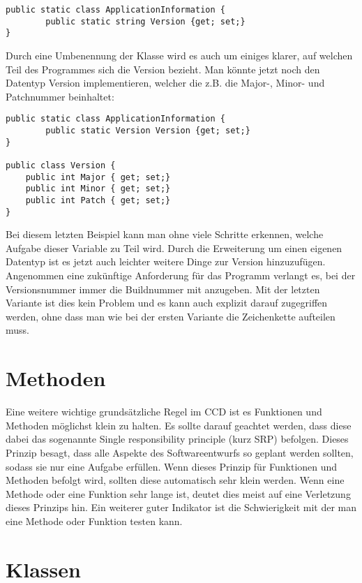 \begin{lstlisting}[caption=Beispiele für die Verwendung von \textit{GetByPredicate}, label=lst:GetByPredicate]
public static class ApplicationInformation {
		public static string Version {get; set;}
}
\end{lstlisting}

Durch eine Umbenennung der Klasse wird es auch um einiges klarer, auf welchen Teil des Programmes sich die Version bezieht. Man könnte jetzt noch den Datentyp Version implementieren, welcher die z.B. die Major-, Minor- und Patchnummer beinhaltet:

\begin{lstlisting}[caption=Beispiele für die Verwendung von \textit{GetByPredicate}, label=lst:GetByPredicate]
public static class ApplicationInformation {
		public static Version Version {get; set;}
}

public class Version {
	public int Major { get; set;}
	public int Minor { get; set;}
	public int Patch { get; set;}
}
\end{lstlisting}

Bei diesem letzten Beispiel kann man ohne viele Schritte erkennen, welche Aufgabe dieser Variable zu Teil wird. Durch die Erweiterung um einen eigenen Datentyp ist es jetzt auch leichter weitere Dinge zur Version hinzuzufügen. Angenommen eine zukünftige Anforderung für das Programm verlangt es, bei der Versionsnummer immer die Buildnummer mit anzugeben. Mit der letzten Variante ist dies kein Problem und es kann auch explizit darauf zugegriffen werden, ohne dass man wie bei der ersten Variante die Zeichenkette aufteilen muss.

\section{Methoden}
Eine weitere wichtige grundsätzliche Regel im CCD ist es Funktionen und Methoden möglichst klein zu halten. Es sollte darauf geachtet werden, dass diese dabei das sogenannte Single responsibility principle (kurz SRP) befolgen. Dieses Prinzip besagt, dass alle Aspekte des Softwareentwurfs so geplant werden sollten, sodass sie nur eine Aufgabe erfüllen. Wenn dieses Prinzip für Funktionen und Methoden befolgt wird, sollten diese automatisch sehr klein werden. Wenn eine Methode oder eine Funktion sehr lange ist, deutet dies meist auf eine Verletzung dieses Prinzips hin. Ein weiterer guter Indikator ist die Schwierigkeit mit der man eine Methode oder Funktion testen kann. 

\section{Klassen}